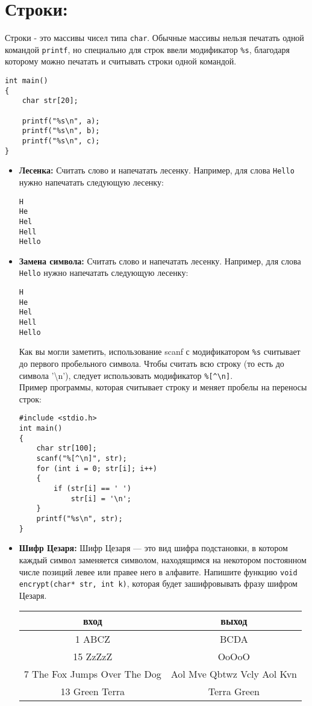 \documentclass{article}
\begin{document}
\section*{Строки:}
Строки - это массивы чисел типа \texttt{char}. Обычные массивы нельзя печатать одной командой \texttt{printf}, но специально для строк ввели модификатор \texttt{\%s}, благодаря которому можно печатать и считывать строки одной командой.
\begin{lstlisting}
int main() 
{
	char str[20];
	
	printf("%s\n", a);
	printf("%s\n", b);
	printf("%s\n", c);
}
\end{lstlisting}
\begin{itemize}
\item \textbf{Лесенка:} Считать слово и напечатать лесенку. Например, для слова \texttt{Hello} нужно напечатать следующую лесенку: 
\begin{verbatim}
H
He
Hel
Hell
Hello
\end{verbatim}

\item \textbf{Замена символа:} Считать слово и напечатать лесенку. Например, для слова \texttt{Hello} нужно напечатать следующую лесенку: 
\begin{verbatim}
H
He
Hel
Hell
Hello
\end{verbatim}
Как вы могли заметить, использование scanf с модификатором \texttt{\%s} считывает до первого пробельного символа. Чтобы считать всю строку (то есть до символа '\textbackslash n'), следует использовать модификатор \verb|%[^\n]|. \\
Пример программы, которая считывает строку и меняет пробелы на переносы строк:
\begin{lstlisting}
#include <stdio.h>
int main() 
{
	char str[100];
	scanf("%[^\n]", str);
	for (int i = 0; str[i]; i++)
	{
		if (str[i] == ' ')
			str[i] = '\n';
	}
	printf("%s\n", str);
}
\end{lstlisting}
\item \textbf{Шифр Цезаря:} Шифр Цезаря — это вид шифра подстановки, в котором каждый символ заменяется символом, находящимся на некотором постоянном числе позиций левее или правее него в алфавите. 
Напишите функцию \texttt{void encrypt(char* str, int k)}, которая будет зашифровывать фразу шифром Цезаря.
\begin{center}
\begin{tabular}{ c | c }
 вход & выход \\ \hline
 1 ABCZ & BCDA\\
 15 ZzZzZ & OoOoO \\
 7 The Fox Jumps Over The Dog & Aol Mve Qbtwz Vcly Aol Kvn \\
 13  Green Terra & Terra Green
\end{tabular}
\end{center}


\end{itemize}
\end{document}
